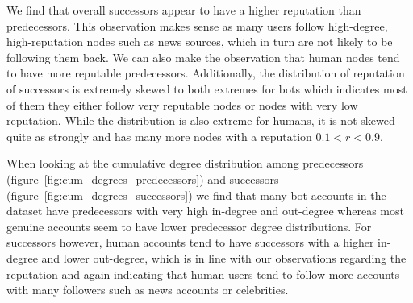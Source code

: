 \bigskip

We find that overall successors appear to have a higher reputation than predecessors. This observation makes sense as many users follow high-degree, high-reputation nodes such as news sources, which in turn are not likely to be following them back. We can also make the observation that human nodes tend to have more reputable predecessors. Additionally, the distribution of reputation of successors is extremely skewed to both extremes for bots which indicates most of them they either follow very reputable nodes or nodes with very low reputation. While the distribution is also extreme for humans, it is not skewed quite as strongly and has many more nodes with a reputation $0.1 < r < 0.9$.

When looking at the cumulative degree distribution among predecessors (figure~\ref{fig:cum_degrees_predecessors}) and successors (figure~\ref{fig:cum_degrees_successors}) we find that many bot accounts in the dataset have predecessors with very high in-degree and out-degree whereas most genuine accounts seem to have lower predecessor degree distributions. For successors however, human accounts tend to have successors with a higher in-degree and lower out-degree, which is in line with our observations regarding the reputation and again indicating that human users tend to follow more accounts with many followers such as news accounts or celebrities. 

